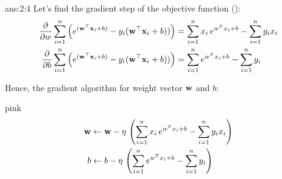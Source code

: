 \documentclass{tron}
\begin{document}
\newpage
\begin{answer}{ans:2:4}
	Let's find the gradient step of the objective function ():
	\begin{align}
		\frac{\partial}{\partial w} \sum_{i=1}^n \left(  e^{(\mathbf{w}^\top \mathbf{x}_i + b)} - {y_i}(\mathbf{w}^\top \mathbf{x}_i + b)) \right) 
			& = \sum_{i=1}^n x_i \, e^{w^T x_i + b} - \sum_{i=1}^n y_i x_i \\
		\frac{\partial}{\partial b} \sum_{i=1}^n \left(  e^{(\mathbf{w}^\top \mathbf{x}_i + b)} - {y_i}(\mathbf{w}^\top \mathbf{x}_i + b)) \right) 
			& = \sum_{i=1}^n e^{w^T x_i + b} - \sum_{i=1}^n y_i \\
	\end{align}
	
	Hence, the gradient algorithm for weight vector $\mathbf{w}$ and $b$:
	\begin{note}{pink}{}
		\begin{align}
			\mathbf{w} &\leftarrow \mathbf{w} - \eta \, \left( \sum_{i=1}^n x_i \, e^{w^T x_i + b} - \sum_{i=1}^n y_i x_i \right)\\
			b 	&\leftarrow b 	- \eta \, \left( \sum_{i=1}^n e^{w^T x_i + b} - \sum_{i=1}^n y_i		 	\right)
		\end{align}
	\end{note}
\end{answer}
\end{document}
